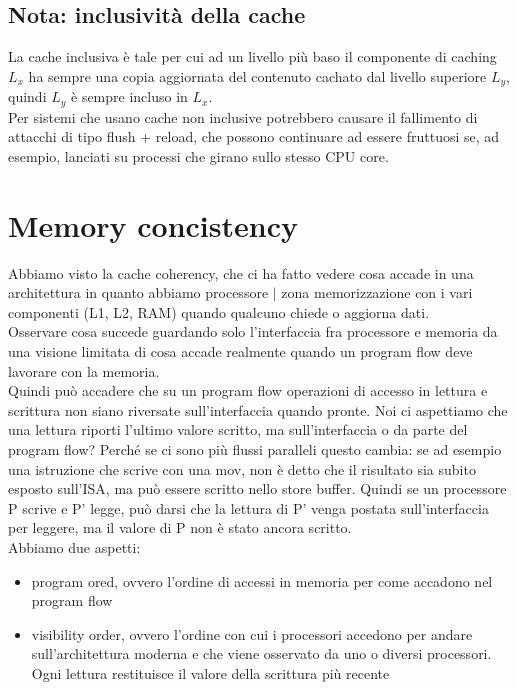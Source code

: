 \documentclass[14pt, oneside]{book}
\begin{document}
\subsection{Nota: inclusività della cache}
La cache inclusiva è tale per cui ad un livello più baso il componente di caching $L_x$ ha sempre una copia aggiornata del contenuto cachato dal livello superiore $L_y$, quindi $L_y$ è sempre incluso in $L_x$.\\ Per sistemi che usano cache non inclusive potrebbero causare il fallimento di attacchi di tipo flush + reload, che possono continuare ad essere fruttuosi se, ad esempio, lanciati su processi che girano sullo stesso CPU core.
\section{Memory concistency}
Abbiamo visto la cache coherency, che ci ha fatto vedere cosa accade in una architettura in quanto abbiamo processore $|$ zona memorizzazione con i vari componenti (L1, L2, RAM) quando qualcuno chiede o aggiorna dati.\\ Osservare cosa succede guardando solo l'interfaccia fra processore e memoria da una visione limitata di cosa accade realmente quando un program flow deve lavorare con la memoria. \\ Quindi può accadere che su un program flow operazioni di accesso in lettura e scrittura non siano riversate sull'interfaccia quando pronte. Noi ci aspettiamo che una lettura riporti l'ultimo valore scritto, ma sull'interfaccia o da parte del program flow? Perché se ci sono più flussi paralleli questo cambia: se ad esempio una istruzione che scrive con una mov, non è detto che il risultato sia subito esposto sull'ISA, ma può essere scritto nello store buffer. Quindi se un processore P scrive e P' legge, può darsi che la lettura di P' venga postata sull'interfaccia per leggere, ma il valore di P non è stato ancora scritto.\\ Abbiamo due aspetti:
\begin{itemize}
\item program ored, ovvero l'ordine di accessi in memoria per come accadono nel program flow
\item visibility order, ovvero l'ordine con cui i processori accedono per andare sull'architettura moderna e che viene osservato da uno o diversi processori. Ogni lettura restituisce il valore della scrittura più recente
\end{itemize}
\end{document}
